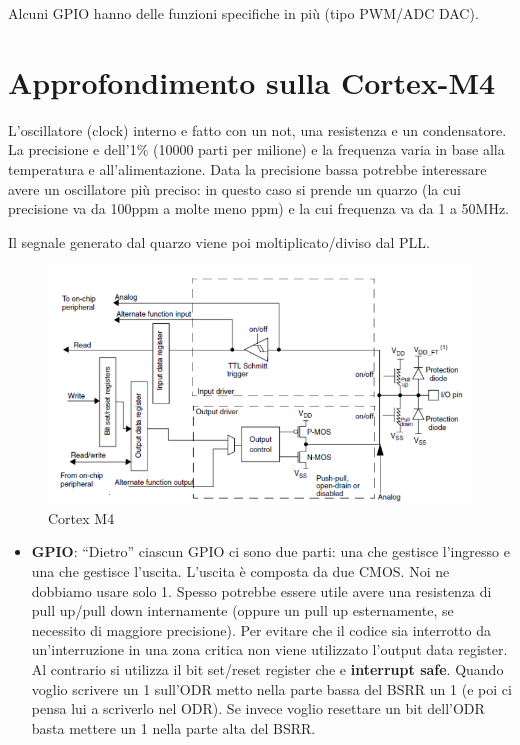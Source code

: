 \documentclass[
]{book}
\providecommand{\tightlist}{%
  \setlength{\itemsep}{0pt}\setlength{\parskip}{0pt}}
\begin{document}
Alcuni GPIO hanno delle funzioni specifiche in più (tipo PWM/ADC DAC).

\section{Approfondimento sulla
Cortex-M4}\label{approfondimento-sulla-cortex-m4}

L'oscillatore (clock) interno e fatto con un not, una resistenza e un
condensatore. La precisione e dell'1\% (10000 parti per milione) e la
frequenza varia in base alla temperatura e all'alimentazione. Data la
precisione bassa potrebbe interessare avere un oscillatore più preciso:
in questo caso si prende un quarzo (la cui precisione va da 100ppm a
molte meno ppm) e la cui frequenza va da 1 a 50MHz.

Il segnale generato dal quarzo viene poi moltiplicato/diviso dal PLL.

\begin{figure}
\centering
\includegraphics[width=0.5\linewidth,height=\textheight,keepaspectratio]{immagini/50.png}
\caption{Cortex M4}
\end{figure}

\begin{itemize}
\tightlist
\item
  \textbf{GPIO}: ``Dietro'' ciascun GPIO ci sono due parti: una che
  gestisce l'ingresso e una che gestisce l'uscita. \newline L'uscita è
  composta da due CMOS. Noi ne dobbiamo usare solo 1. Spesso potrebbe
  essere utile avere una resistenza di pull up/pull down internamente
  (oppure un pull up esternamente, se necessito di maggiore precisione).
  Per evitare che il codice sia interrotto da un'interruzione in una
  zona critica non viene utilizzato l'output data register. \newline Al
  contrario si utilizza il bit set/reset register che e
  \textbf{interrupt safe}. \newline Quando voglio scrivere un 1 sull'ODR
  metto nella parte bassa del BSRR un 1 (e poi ci pensa lui a scriverlo
  nel ODR). Se invece voglio resettare un bit dell'ODR basta mettere un
  1 nella parte alta del BSRR.
\end{itemize}
\end{document}
